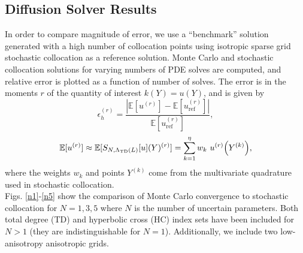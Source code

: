 \documentclass{mc2015}
\newcommand{\expv}[1]{\ensuremath{\mathbb{E}[ #1]}}
\begin{document}
\subsection{Diffusion Solver Results}
In order to compare magnitude of error, we use a ``benchmark'' solution generated with a high number of collocation points using isotropic sparse grid stochastic collocation as a reference solution.  Monte Carlo and stochastic collocation solutions for varying numbers of PDE solves are computed, and relative error is plotted as a function of number of solves.  The error is in the moments $r$ of the quantity of interest $k(Y)=u(Y)$, and is given by
\begin{equation}
\epsilon_h^{(r)}=\frac{|\expv{u^{(r)}}-\expv{u_\text{ref}^{(r)}}|}{\expv{u_\text{ref}^{(r)}}},
\end{equation}
\begin{equation}
\expv{u^{(r)}}\approx\expv{S_{N,\Lambda_\text{TD}(L)}[u](Y)^{(r)}}=\sum_{k=1}^\eta w_k ~u^{(r)}\qty(Y^{(k)}),
\end{equation}
where the weights $w_k$ and points $Y^{(k)}$ come from the multivariate quadrature used in stochastic collocation.\\

Figs. \ref{n1}-\ref{n5} show the comparison of Monte Carlo convergence to stochastic collocation for $N=1,3,5$ where $N$ is the number of uncertain parameters.  Both total degree (TD) and hyperbolic cross (HC) index sets have been included for $N>1$ (they are indistinguishable for $N=1$).  Additionally, we include two low-anisotropy anisotropic grids.\\
\end{document}
